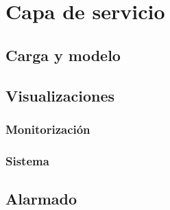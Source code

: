 \chapter{Capa de servicio}
\label{chapter:servicio}

\section{Carga y modelo}


\section{Visualizaciones}

\subsection{Monitorización}
\subsection{Sistema}

\section{Alarmado}


